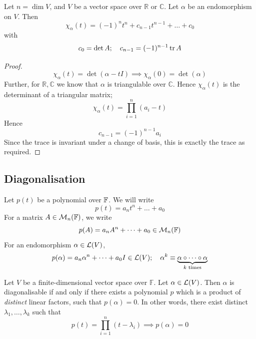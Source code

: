 \documentclass[a4paper,11pt]{article}
\begin{document}
\begin{lemma}
	Let $ n = \dim V $, and $ V $ be a vector space over $ \mathbb R $ or $ \mathbb C $.
	Let $ \alpha $ be an endomorphism on $ V $.
	Then
	\[
		\chi_\alpha(t) = (-1)^n t^n + c_{n-1} t^{n-1} + \dots + c_0
	\]
	with
	\[
		c_0 = \det A;\quad c_{n-1} = (-1)^{n-1} \tr A
	\]
\end{lemma}
\begin{proof}
	\[
		\chi_\alpha(t) = \det(\alpha - t I) \implies \chi_\alpha(0) = \det(\alpha)
	\]
	Further, for $ \mathbb R, \mathbb C $ we know that $ \alpha $ is triangulable over $ \mathbb C $.
	Hence $ \chi_\alpha(t) $ is the determinant of a triangular matrix;
	\[
		\chi_\alpha(t) = \prod_{i=1}^n (a_i - t)
	\]
	Hence
	\[
		c_{n-1} = (-1)^{n-1} a_i
	\]
	Since the trace is invariant under a change of basis, this is exactly the trace as required.
\end{proof}


\subsection{Diagonalisation}
Let $ p(t) $ be a polynomial over $ {\mathbb{F}} $.
We will write
\[
	p(t) = a_n t^n + \dots + a_0
\]
For a matrix $ A \in {\mathcal{M}}_n({\mathbb{F}}) $, we write
\[
	p(A) = a_n A^n + \dots + a_0 \in {\mathcal{M}}_n({\mathbb{F}})
\]
For an endomorphism $ \alpha \in {\mathcal{L}}(V) $,
\[
	p(\alpha) = a_n \alpha^n + \dots + a_0 I \in {\mathcal{L}}(V);\quad \alpha^k \equiv \underbrace{\alpha \circ \dots \circ \alpha}_{k \text{ times}}
\]

\begin{theorem}
	Let $V$ be a finite-dimensional vector space over $\mathbb{F}$. Let $\alpha\in {\mathcal{L}}(V)$. Then $\alpha$ is diagonalisable if and only if there exists a polynomial $ p $ which is a product of \textit{distinct} linear factors, such that $ p(\alpha) = 0 $.
	In other words, there exist distinct $ \lambda_1, \dots, \lambda_k $ such that
	\[
		p(t) = \prod_{i=1}^n (t - \lambda_i) \implies p(\alpha) = 0
	\]
\end{theorem}
\end{document}
